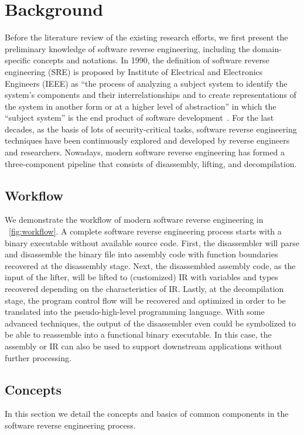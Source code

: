 \chapter{Background}\label{sec-background}

Before the literature review of the existing research efforts, we first present
the preliminary knowledge of software reverse engineering, including the
domain-specific concepts and notations. In 1990, the definition of software
reverse engineering (SRE) is proposed by Institute of Electrical and
Electronics Engineers (IEEE) as ``the process of analyzing a subject system to
identify the system's components and their interrelationships and to create
representations of the system in another form or at a higher level of
abstraction'' in which the ``subject system'' is the end product of software
development~\cite{ieee-sre}.
For the last decades, as the basis of lots of security-critical tasks, software
reverse engineering techniques have been continuously explored and developed by
reverse engineers and researchers. Nowadays, modern software reverse
engineering has formed a three-component pipeline that consists of disassembly,
lifting, and decompilation.


\section{Workflow} \label{sec:background-workflow}
We demonstrate the workflow of modern software reverse engineering in
\F~\ref{fig:workflow}. A complete software reverse engineering process starts
with a binary executable without available source code. First, the disassembler
will parse and disassemble the binary file into assembly code with function
boundaries recovered at the disassembly stage. Next, the disassembled assembly
code, as the input of the lifter, will be lifted to (customized) IR with
variables and types recovered depending on the characteristics of IR. Lastly,
at the decompilation stage, the program control flow will be recovered and
optimized in order to be translated into the pseudo-high-level programming
language. With some advanced techniques, the output of the disassembler even
could be symbolized to be able to reassemble into a functional binary
executable. In this case, the assembly or IR can also be used to support
downstream applications without further processing.

\section{Concepts} \label{sec:background-concepts}
In this section we detail the concepts and basics of common components in the
software reverse engineering process.

